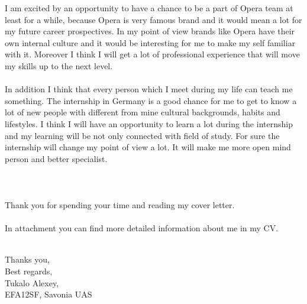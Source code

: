 \documentclass[english]{article}
\begin{document}
I am excited by an opportunity to have a chance to be a part of Opera team at least for a while, because Opera is very famous brand and it would mean a lot for my future career prospectives. In my point of view brands like Opera have their own internal culture and it would be interesting for me to make my self familiar with it. Moreover I think I will get a lot of professional experience that will move my skills up to the next level. \\\\
In addition I think that every person which I meet during my life can teach me something. The internship in Germany is a good chance for me to get to know a lot of new people with different from mine cultural backgrounds, habits and lifestyles. I think I will have an opportunity to learn a lot during the internship and my learning will be not only connected with field of study. For sure the internship will change my point of view a lot. It will make me more open mind person and better specialist.\\\\
 \\\\
Thank you for spending your time and reading my cover letter.\\\\

In attachment you can find more detailed information about me in my CV.\\\\

\begin{flushright}

Thanks you,\\
Best regards, \\
Tukalo Alexey,\\
EFA12SF, Savonia UAS\\
     

\end{flushright}
\end{document}

